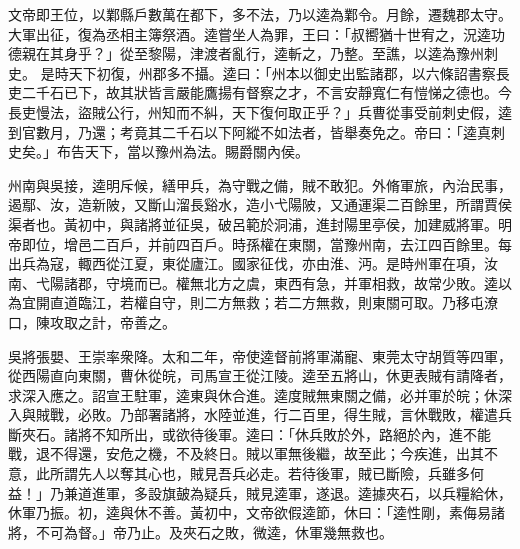 \begin{pinyinscope}
 
文帝即王位，以鄴縣戶數萬在都下，多不法，乃以逵為鄴令。月餘，遷魏郡太守。
 大軍出征，復為丞相主簿祭酒。逵嘗坐人為罪，王曰：「叔嚮猶十世宥之，況逵功德親在其身乎？」從至黎陽，津渡者亂行，逵斬之，乃整。至譙，以逵為豫州刺史。
 是時天下初復，州郡多不攝。逵曰：「州本以御史出監諸郡，以六條詔書察長吏二千石已下，故其狀皆言嚴能鷹揚有督察之才，不言安靜寬仁有愷悌之德也。今長吏慢法，盜賊公行，州知而不糾，天下復何取正乎？」兵曹從事受前刺史假，逵到官數月，乃還；考竟其二千石以下阿縱不如法者，皆舉奏免之。帝曰：「逵真刺史矣。」布告天下，當以豫州為法。賜爵關內侯。
 
 
 
 
 州南與吳接，逵明斥候，繕甲兵，為守戰之備，賊不敢犯。外脩軍旅，內治民事，遏鄢、汝，造新陂，又斷山溜長谿水，造小弋陽陂，又通運渠二百餘里，所謂賈侯渠者也。黃初中，與諸將並征吳，破呂範於洞浦，進封陽里亭侯，加建威將軍。明帝即位，增邑二百戶，并前四百戶。時孫權在東關，當豫州南，去江四百餘里。每出兵為寇，輙西從江夏，東從廬江。國家征伐，亦由淮、沔。是時州軍在項，汝南、弋陽諸郡，守境而已。權無北方之虞，東西有急，并軍相救，故常少敗。逵以為宜開直道臨江，若權自守，則二方無救；若二方無救，則東關可取。乃移屯潦口，陳攻取之計，帝善之。
 
 
吳將張嬰、王崇率衆降。太和二年，帝使逵督前將軍滿寵、東莞太守胡質等四軍，從西陽直向東關，曹休從皖，司馬宣王從江陵。逵至五將山，休更表賊有請降者，求深入應之。詔宣王駐軍，逵東與休合進。逵度賊無東關之備，必并軍於皖；休深入與賊戰，必敗。乃部署諸將，水陸並進，行二百里，得生賊，言休戰敗，權遣兵斷夾石。諸將不知所出，或欲待後軍。逵曰：「休兵敗於外，路絕於內，進不能戰，退不得還，安危之機，不及終日。賊以軍無後繼，故至此；今疾進，出其不意，此所謂先人以奪其心也，賊見吾兵必走。若待後軍，賊已斷險，兵雖多何益！」乃兼道進軍，多設旗皷為疑兵，賊見逵軍，遂退。逵據夾石，以兵糧給休，休軍乃振。初，逵與休不善。黃初中，文帝欲假逵節，休曰：「逵性剛，素侮易諸將，不可為督。」帝乃止。及夾石之敗，微逵，休軍幾無救也。
 

\end{pinyinscope}
